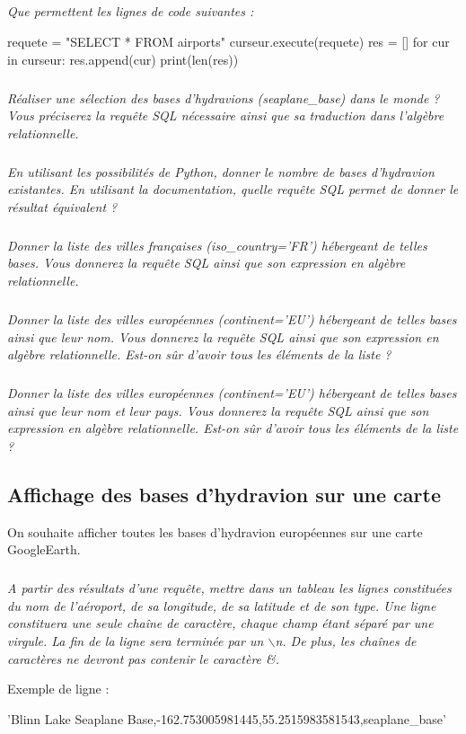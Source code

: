\documentclass[10pt]{article}
\begin{document}
\subparagraph{}
\textit{Que permettent les lignes de code suivantes :}

\begin{py}
\begin{python}
requete = "SELECT * FROM airports"
curseur.execute(requete)
res = []
for cur in curseur:
    res.append(cur)
print(len(res))
\end{python}
\end{py}

\subparagraph{}
\textit{Réaliser une sélection des bases d'hydravions (\textsf{seaplane\_base}) dans le monde ? Vous préciserez la requête SQL nécessaire ainsi que sa traduction dans l'algèbre relationnelle. }


\subparagraph{}
\textit{En utilisant les possibilités de Python, donner le nombre de bases d'hydravion existantes. En utilisant la documentation, quelle requête SQL permet de donner le résultat équivalent ?}

\subparagraph{}
\textit{Donner la liste des villes françaises (\textsl{iso\_country='FR'}) hébergeant de telles bases. Vous donnerez la requête SQL ainsi que son expression en algèbre relationnelle.}


\subparagraph{}
\textit{Donner la liste des villes européennes (\textsl{continent='EU'}) hébergeant de telles bases ainsi que leur nom. Vous donnerez la requête SQL ainsi que son expression en algèbre relationnelle. Est-on sûr d'avoir tous les éléments de la liste ?}


\subparagraph{}
\textit{Donner la liste des villes européennes (\textsl{continent='EU'}) hébergeant de telles bases ainsi que leur nom et leur pays. Vous donnerez la requête SQL ainsi que son expression en algèbre relationnelle. Est-on sûr d'avoir tous les éléments de la liste ?}


\subsection*{Affichage des bases d'hydravion sur une carte}
On souhaite afficher toutes les bases d'hydravion européennes sur une carte GoogleEarth. 


\subparagraph{}
\textit{A partir des résultats d'une requête, mettre dans un tableau les lignes constituées du nom de l'aéroport, de sa longitude, de sa latitude et de son type. Une ligne constituera une seule chaîne de caractère, chaque champ étant séparé par une virgule. La fin de la ligne sera terminée par un $\backslash$n. De plus, les chaînes de caractères ne devront pas contenir le caractère \&.}

\begin{exemple}
Exemple de ligne : 
\begin{python}
'Blinn Lake Seaplane Base,-162.753005981445,55.2515983581543,seaplane_base\n'
\end{python}
\end{exemple}
\end{document}
